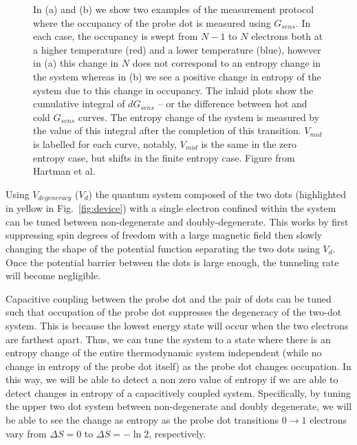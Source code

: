 \begin{figure}[h]
\centering
{}
\caption{ In (a) and (b) we show two examples of the measurement protocol where the occupancy of the probe dot is measured using $G_{sens}$. In each case, the occupancy is swept from $N - 1$ to $N$ electrons both at a higher temperature (red) and a lower temperature (blue), however in (a) this change in $N$ does not correspond to an entropy change in the system whereas in (b) we see a positive change in entropy of the system due to this change in occupancy. The inlaid plots show the cumulative integral of $d G_{sens}$ -- or the difference between hot and cold $G_{sens}$ curves. The entropy change of the system is measured by the value of this integral after the completion of this transition. $V_{mid}$ is labelled for each curve, notably, $V_{mid}$ is the same in the zero entropy case, but shifts in the finite entropy case. Figure from Hartman et al.}
\label{fig:num_int}       %
\end{figure}

Using $V_{degeneracy}$ ($V_d$) the quantum system composed of the two dots (highlighted in yellow in Fig.~\ref{fig:device}) with a single electron confined within the system can be tuned between non-degenerate and doubly-degenerate. This works by first suppressing spin degrees of freedom with a large magnetic field then slowly changing the shape of the potential function separating the two dots using $V_d$. Once the potential barrier between the dots is large enough, the tunneling rate will become negligible.

Capacitive coupling between the probe dot and the pair of dots can be tuned such that occupation of the probe dot suppresses the degeneracy of the two-dot system. This is because the lowest energy state will occur when the two electrons are farthest apart. Thus, we can tune the system to a state where there is an entropy change of the entire thermodynamic system independent (while no change in entropy of the probe dot itself) as the probe dot changes occupation. In this way, we will be able to detect a non zero value of entropy if we are able to detect changes in entropy of a capacitively coupled system. Specifically, by tuning the upper two dot system between non-degenerate and doubly degenerate, we will be able to see the change as entropy as the probe dot transitions $0 \to 1$ electrons vary from $\Delta S = 0$ to $\Delta S = -\ln2$, respectively.



